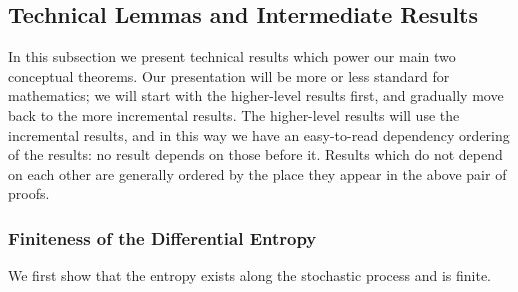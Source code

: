 \documentclass[../../book-main.tex]{subfiles}
\begin{document}
\subsection{Technical Lemmas and Intermediate
Results}\label{sub:app_diffusion_intermediate_results}

In this subsection we present technical results which power our main
two conceptual theorems. Our presentation will be more or less
standard for mathematics; we will start with the higher-level results
first, and gradually move back to the more incremental results. The
higher-level results will use the incremental results, and in this
way we have an easy-to-read dependency ordering of the results: no
result depends on those before it. Results which do not depend on
each other are generally ordered by the place they appear in the
above pair of proofs.

\subsubsection{Finiteness of the Differential Entropy}

We first show that the entropy exists along the stochastic process
and is finite.
\end{document}
